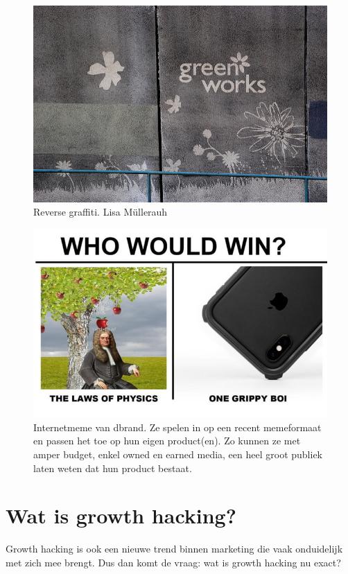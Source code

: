 \begin{figure}[h!]
	\includegraphics[width=\linewidth]{img/reverse-graffiti.jpg}
	\centering
	\caption{Reverse graffiti. \textcopyright  Lisa Müllerauh}
	\label{fig:defGrowthHacker}
\end{figure}

\begin{figure}[h!]
	\includegraphics[width=\linewidth]{img/dbrand-internetmeme.jpg}
	\centering
	\caption{Internetmeme van dbrand. Ze spelen in op een recent memeformaat en passen het toe op hun eigen product(en). Zo kunnen ze met amper budget, enkel owned en earned media, een heel groot publiek laten weten dat hun product bestaat.}
	\label{fig:defGrowthHacker}
\end{figure}

\section{Wat is growth hacking?}
\label{sec:wat-is-growth-hacking}
Growth hacking is ook een nieuwe trend binnen marketing die vaak onduidelijk met zich mee brengt. Dus dan komt de vraag: wat is growth hacking nu exact?

